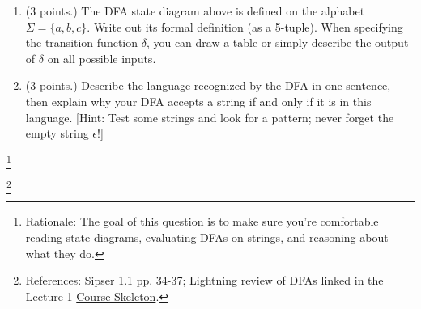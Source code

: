 \documentclass[letterpaper,11pt,twoside]{article}
\theoremstyle{plain}
\theoremstyle{definition}
\theoremstyle{remark}
\theoremstyle{restate}
\newcommand\blfootnote[1]{%
  \begingroup
  \renewcommand\thefootnote{}\footnote{#1}%
  \addtocounter{footnote}{-1}%
  \endgroup
}
\begin{document}
\begin{enumerate}
    \item (3 points.) The DFA state diagram above is defined on the alphabet $\Sigma = \{a,b,c\}$. Write out its formal definition (as a 5-tuple). When specifying the transition function $\delta$, you can draw a table or simply describe the output of $\delta$ on all possible inputs. 
    
    \item (3 points.) Describe the language recognized by the DFA in one sentence, then explain why your DFA accepts a string if and only if it is in this language. [Hint: Test some strings and look for a pattern; never forget the empty string $\epsilon$!]
    
    \end{enumerate}
    
\blfootnote{ Rationale: The goal of this question is to make sure you're comfortable reading state diagrams, evaluating DFAs on strings, and reasoning about what they do. }
\blfootnote{ References: Sipser 1.1 pp. 34-37; Lightning review of DFAs linked in the Lecture 1 \href{https://docs.google.com/document/d/1PHCNkMitYsMpbh-sxrBmr-cGbpUEshfdFDS2k09fHrI}{Course Skeleton}.}
    
\clearpage
\end{document}
